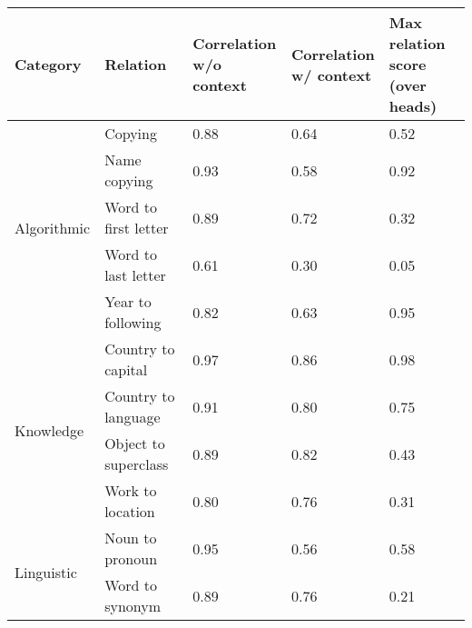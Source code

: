 \begin{tabular}{lllll}
\toprule
Category & Relation & \makecell{Correlation\\w/o context} & \makecell{Correlation\\w/ context} & \makecell{Max relation score\\(over heads)} \\
\midrule
\multirow{5}{*}{Algorithmic} & Copying & 0.88 & 0.64 & 0.52 \\
 & Name copying & 0.93 & 0.58 & 0.92 \\
 & Word to first letter & 0.89 & 0.72 & 0.32 \\
 & Word to last letter & 0.61 & 0.30 & 0.05 \\
 & Year to following & 0.82 & 0.63 & 0.95 \\
\multirow{4}{*}{Knowledge} & Country to capital & 0.97 & 0.86 & 0.98 \\
 & Country to language & 0.91 & 0.80 & 0.75 \\
 & Object to superclass & 0.89 & 0.82 & 0.43 \\
 & Work to location & 0.80 & 0.76 & 0.31 \\
\multirow{2}{*}{Linguistic} & Noun to pronoun & 0.95 & 0.56 & 0.58 \\
 & Word to synonym & 0.89 & 0.76 & 0.21 \\
\bottomrule
\end{tabular}
